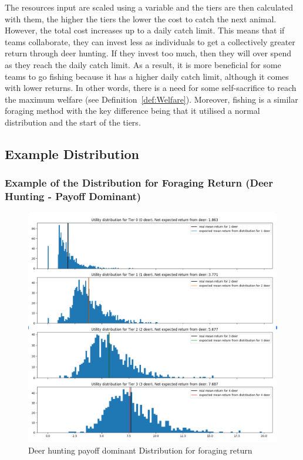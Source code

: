 The resources input are scaled using a variable and the tiers are then calculated with them, the higher the tiers the lower the cost to catch the next animal. However, the total cost increases up to a daily catch limit. This means that if teams collaborate, they can invest less as individuals to get a collectively greater return through deer hunting. If they invest too much, then they will over spend as they reach the daily catch limit. As a result, it is more beneficial for some teams to go fishing because it has a higher daily catch limit, although it comes with lower returns. In other words, there is a need for some self-sacrifice to reach the maximum welfare (see Definition~\ref{def:Welfare}). Moreover, fishing is a similar foraging method with the key difference being that it utilised a normal distribution and the start of the tiers.

\subsection{Example Distribution}
\subsubsection{Example of the Distribution for Foraging Return (Deer Hunting - Payoff Dominant)}

\begin{figure}[!htb]
    \centering
    \includegraphics[width=1\textwidth]{04_environment/images/Distribution of Foraging returns Deer Hunting.PNG}
    \caption{Deer hunting payoff dominant Distribution for foraging return}
    \label{fig:Distribution of Foraging returns Deer Hunting}
\end{figure}


